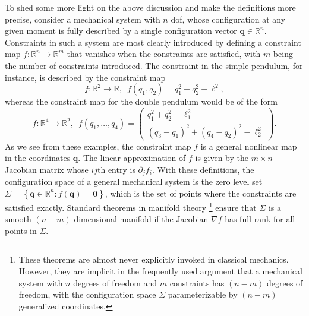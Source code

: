 To shed some more light on the above discussion and make the definitions more precise, consider a mechanical system with $n$ \ac{dof}, whose configuration at any given moment is fully described by a single configuration vector $\bm{q} \in \mathbb{R}^{n}$.
Constraints in such a system are most clearly introduced by defining a constraint map $f: \mathbb{R}^{n} \to \mathbb{R}^{m}$
that vanishes when the constraints are satisfied, with $m$ being the number of constraints introduced.
The constraint in the simple pendulum, for instance, is described by the constraint map
%
\begin{equation}
    f: \mathbb{R}^{2} \to \mathbb{R},\enspace f(q_{1}, q_{2}) = q_{1}^{2} + q_{2}^{2} - \ell^{2},
\end{equation}
%
whereas the constraint map for the double pendulum would be of the form
%
\begin{equation}
  f: \mathbb{R}^{4} \to \mathbb{R}^{2},\enspace f(q_{1}, \ldots, q_{4}) =
\begin{pmatrix}
 q_{1}^{2} + q_{2}^{2} - \ell_{1}^{2}\\
 (q_{3} - q_{1})^{2} + (q_{4} - q_{2})^{2} - \ell_{2}^{2}
\end{pmatrix}.
\end{equation}
%
As we see from these examples, the constraint map $f$ is a general nonlinear map in the coordinates $\bm{q}$.
The linear approximation of $f$ is given by the $m\times n$ Jacobian matrix whose $i\!j$th entry is $\partial_{j}f_{i}$.
With these definitions, the configuration space of a general mechanical system is the zero level set $\Sigma = \left\{\bm{q} \in \mathbb{R}^{n} : f(\bm{q}) = \bm{0}\right\}$, which is the set of points where the constraints are satisfied exactly.
Standard theorems in manifold theory%
\footnote{These theorems are almost never explicitly invoked in classical mechanics.
However, they are implicit in the frequently used argument that a mechanical system with $n$ degrees of freedom and $m$ constraints has $(n-m)$ degrees of freedom, with the configuration space $\Sigma$ parameterizable by $(n-m)$ generalized coordinates.}
ensure that $\Sigma$ is a smooth $(n-m)$-dimensional manifold if the Jacobian $\nabla f$ has full rank for all points in $\Sigma$.

